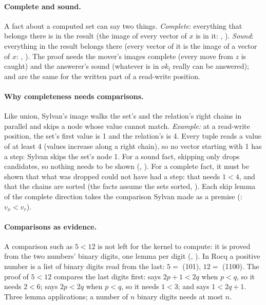 \paragraph{Complete and sound.} A fact about a computed set can say two
things. \emph{Complete}: everything that belongs there is in the result
(the image of every vector of $x$ is in it: ,
). \emph{Sound}: everything in the result
belongs there (every vector of it is the image of a vector of $x$:
, ). The proof needs the mover's
images complete (every move from $z$ is caught) and the answerer's sound
(whatever is in $\mathit{ok}_l$ really can be answered);  and
 are the same for the written part of a read-write position.

\paragraph{Why completeness needs comparisons.} Like union, Sylvan's image
walks the set's and the relation's right chains in parallel and skips a
node whose value cannot match. \emph{Example:} at a read-write position,
the set's first value is 1 and the relation's is 4. Every tuple reads a
value of at least 4 (values increase along a right chain), so no vector
starting with 1 has a step: Sylvan skips the set's node 1. For a sound
fact, skipping only drops candidates, so nothing needs to be shown
(, ). For a complete fact, it must be shown
that what was dropped could not have had a step: that needs $1 < 4$, and
that the chains are sorted (the facts assume the sets sorted, ).
Each skip lemma of the complete direction takes the comparison Sylvan
made as a premise (: $v_x < v_r$).

\paragraph{Comparisons as evidence.} A comparison such as $5 < 12$ is not
left for the kernel to compute: it is proved from the two numbers' binary
digits, one lemma per digit (, ). In Rocq a
positive number is a list of binary digits read from the last:
$5 = $  (101), $12 = $  (1100).
The proof of $5 < 12$ compares the last digits first: 
says $2p+1 < 2q$ when $p < q$, so it needs $2 < 6$;  says
$2p < 2q$ when $p < q$, so it needs $1 < 3$; and  says
$1 < 2q+1$. Three lemma applications; a number of $n$ binary digits needs
at most $n$.

